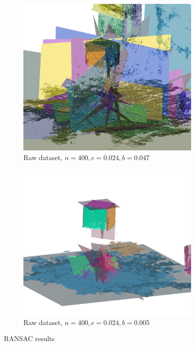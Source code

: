 \begin{figure}[htbp]
    \begin{subfigure}[b]{0.5\textwidth}
        \centering
        \includegraphics[width=0.7\linewidth]{images/results_all}
        \caption{Raw dataset, $n=400, e=0.024, b=0.047$}
    \end{subfigure}%
    \begin{subfigure}[b]{0.5\textwidth}
        \centering
        \includegraphics[width=0.7\linewidth]{images/results-all-2}
        \caption{Raw dataset, $n=400, e=0.024, b=0.005$}
    \end{subfigure}%
    \caption{RANSAC results}
    \label{fig:real-data-ransac}
\end{figure}


